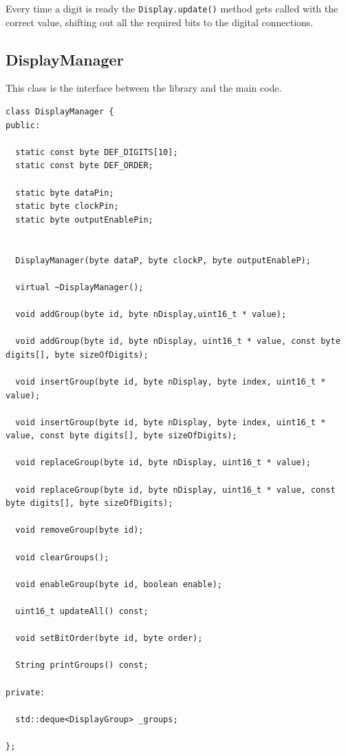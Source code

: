 \documentclass[11pt,english]{article}
\newcommand{\code}[1]{\texttt{#1}}
\begin{document}
Every time a digit is ready the \code{Display.update()} method gets called with the correct value, 
shifting out all the required bits to the digital connections.


\subsection{DisplayManager}

This class is the interface between the library and the main code. 
%                                       
\begin{lstlisting}[label=lis:display-manager,caption=DisplayManager class]
class DisplayManager {
public:

  static const byte DEF_DIGITS[10]; 
  static const byte DEF_ORDER;      

  static byte dataPin;          
  static byte clockPin;         
  static byte outputEnablePin;  


  DisplayManager(byte dataP, byte clockP, byte outputEnableP);

  virtual ~DisplayManager();

  void addGroup(byte id, byte nDisplay,uint16_t * value);

  void addGroup(byte id, byte nDisplay, uint16_t * value, const byte digits[], byte sizeOfDigits);

  void insertGroup(byte id, byte nDisplay, byte index, uint16_t * value);

  void insertGroup(byte id, byte nDisplay, byte index, uint16_t * value, const byte digits[], byte sizeOfDigits);

  void replaceGroup(byte id, byte nDisplay, uint16_t * value);

  void replaceGroup(byte id, byte nDisplay, uint16_t * value, const byte digits[], byte sizeOfDigits);

  void removeGroup(byte id);

  void clearGroups();

  void enableGroup(byte id, boolean enable);

  uint16_t updateAll() const;

  void setBitOrder(byte id, byte order);

  String printGroups() const;

private:

  std::deque<DisplayGroup> _groups;

};
\end{lstlisting}
\end{document}
